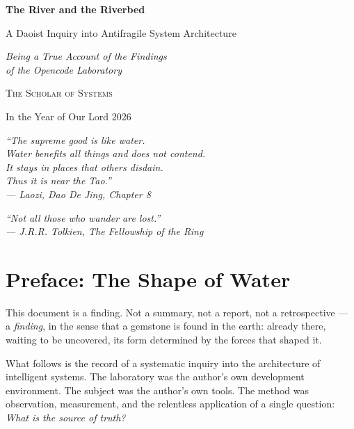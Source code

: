 \documentclass[12pt,a4paper,oneside]{book}
\begin{document}
\frontmatter

\begin{titlepage}
\centering
\vspace*{2cm}
{\Huge\bfseries\color{daoGreen} The River and the Riverbed\par}
\vspace{0.5cm}
{\Large A Daoist Inquiry into Antifragile System Architecture\par}
\vspace{0.3cm}
{\large\itshape Being a True Account of the Findings\\ of the Opencode Laboratory\par}
\vspace{1.5cm}
{\Large\textsc{The Scholar of Systems}\par}
\vspace{0.5cm}
{\large In the Year of Our Lord 2026\par}
\vspace{1cm}
{\small\itshape
``The supreme good is like water.\\ 
Water benefits all things and does not contend.\\
It stays in places that others disdain.\\
Thus it is near the Tao.''\\
--- Laozi, Dao De Jing, Chapter 8\par}
\vspace{1cm}
{\small\itshape
``Not all those who wander are lost.''\\
--- J.R.R. Tolkien, The Fellowship of the Ring\par}
\vfill
\end{titlepage}

\chapter*{Preface: The Shape of Water}

This document is a finding. Not a summary, not a report, not a retrospective --- a \emph{finding}, in the sense that a gemstone is found in the earth: already there, waiting to be uncovered, its form determined by the forces that shaped it.

What follows is the record of a systematic inquiry into the architecture of intelligent systems. The laboratory was the author's own development environment. The subject was the author's own tools. The method was observation, measurement, and the relentless application of a single question: \emph{What is the source of truth?}
\end{document}
